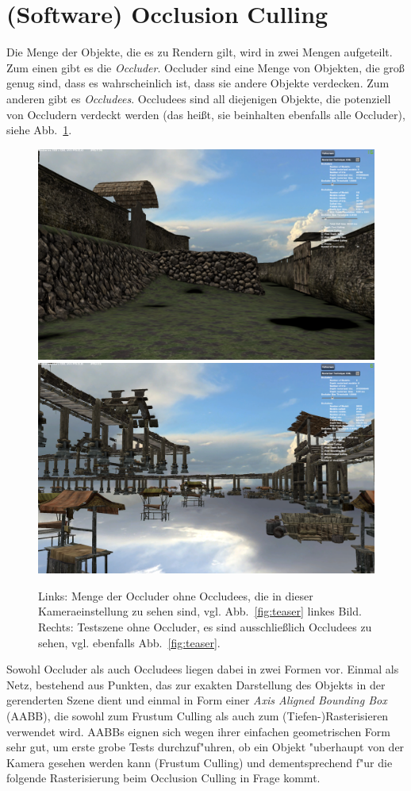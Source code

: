 \documentclass[journal]{vgtc}
\begin{document}
\section{(Software) Occlusion Culling}
Die Menge der Objekte, die es zu Rendern gilt, wird in zwei Mengen aufgeteilt.
Zum einen gibt es die \textit{Occluder}.
Occluder sind eine Menge von Objekten, die gro{\ss} genug sind, dass es wahrscheinlich ist, dass sie andere Objekte verdecken.
Zum anderen gibt es \textit{Occludees}.
Occludees sind all diejenigen Objekte, die potenziell von Occludern verdeckt werden (das hei{\ss}t, sie beinhalten ebenfalls alle Occluder), siehe Abb.\ \ref{fig:objects}.
\begin{figure}%
\includegraphics[width=0.5\columnwidth]{images/Occluder.png}%
\includegraphics[width=0.5\columnwidth]{images/Occludees.png}%
\caption{Links: Menge der Occluder ohne Occludees, die in dieser Kameraeinstellung zu sehen sind, vgl. Abb.\ \ref{fig:teaser} linkes Bild. Rechts: Testszene ohne Occluder, es sind ausschlie{\ss}lich Occludees zu sehen, vgl. ebenfalls Abb.\ \ref{fig:teaser}.}%
\label{fig:objects}%
\end{figure}
Sowohl Occluder als auch Occludees liegen dabei in zwei Formen vor.
Einmal als Netz, bestehend aus Punkten, das zur exakten Darstellung des Objekts in der gerenderten Szene dient und einmal in Form einer \textit{Axis Aligned Bounding Box} (AABB), die sowohl zum Frustum Culling als auch zum (Tiefen-)Rasterisieren verwendet wird.
AABBs eignen sich wegen ihrer einfachen geometrischen Form sehr gut, um erste grobe Tests durchzuf"uhren, ob ein Objekt "uberhaupt von der Kamera gesehen werden kann (Frustum Culling) und dementsprechend f"ur die folgende Rasterisierung beim Occlusion Culling in Frage kommt. \\
\end{document}
